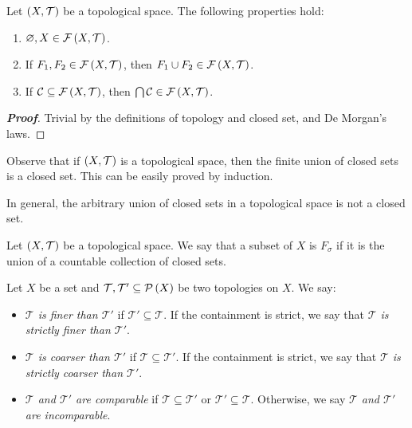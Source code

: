 \begin{proposition}
  Let $\left(X,\mathcal{T}\right)$ be a topological space. The following properties hold:

  \begin{enumerate}
      \item $\varnothing,X\in\mathcal{F}\left(X,\mathcal{T}\right)$.
      \item If $F_1,F_2\in\mathcal{F}\left(X,\mathcal{T}\right)$, then $F_1\cup F_2\in\mathcal{F}\left(X,\mathcal{T}\right)$.
      \item If $\mathcal{C}\subseteq\mathcal{F}\left(X,\mathcal{T}\right)$, then $\bigcap{\mathcal{C}}\in\mathcal{F}\left(X,\mathcal{T}\right)$.
  \end{enumerate}
  \begin{proof}[\rm\textbf{Proof}]
    Trivial by the definitions of topology and closed set, and De Morgan's laws.
  \end{proof}
\end{proposition}

\begin{remark}
  Observe that if $\left(X,\mathcal{T}\right)$ is a topological space, then the finite union of closed sets is a closed set. This can be easily proved by induction.
\end{remark}

In general, the arbitrary union of closed sets in a topological space is not a closed set.

\begin{definition}
  Let $\left(X,\mathcal{T}\right)$ be a topological space. We say that a subset of $X$ is $F_{\sigma}$ if it is the union of a countable collection of closed sets.
\end{definition}


\begin{definition}
  Let $X$ be a set and $\mathcal{T},\mathcal{T}'\subseteq\mathcal{P}\left(X\right)$ be two topologies on $X$. We say:

  \begin{itemize}
    \item \emph{$\mathcal{T}$ is finer than $\mathcal{T}'$} if $\mathcal{T}'\subseteq\mathcal{T}$. If the containment is strict, we say that \emph{$\mathcal{T}$ is strictly finer than $\mathcal{T}'$}.
    \item \emph{$\mathcal{T}$ is coarser than $\mathcal{T}'$} if $\mathcal{T}\subseteq\mathcal{T}'$. If the containment is strict, we say that \emph{$\mathcal{T}$ is strictly coarser than $\mathcal{T}'$}.
    \item \emph{$\mathcal{T}$ and $\mathcal{T}'$ are comparable} if $\mathcal{T}\subseteq\mathcal{T}'$ or $\mathcal{T'}\subseteq\mathcal{T}$. Otherwise, we say \emph{$\mathcal{T}$ and $\mathcal{T}'$ are incomparable}.
  \end{itemize}
\end{definition}

